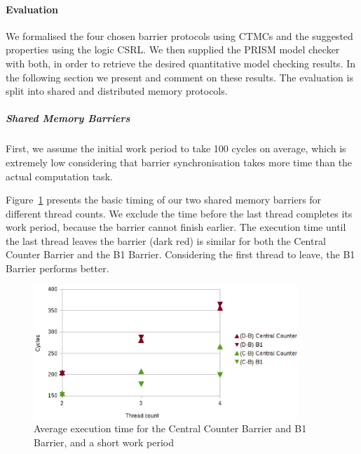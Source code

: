 \documentclass[a4paper, 10pt]{article}
\begin{document}
\paragraph{Evaluation}
\label{ssssec:analysis-modelchecking-quantitative-properties-evaluation}
We formalised the four chosen barrier protocols using CTMCs and the suggested properties using the logic CSRL.
We then supplied the PRISM model checker with both, in order to retrieve the desired quantitative model checking results.
In the following section we present and comment on these results.
The evaluation is split into shared and distributed memory protocols.

\subparagraph{Shared Memory Barriers}
\label{sssssec:analysis-modelchecking-quantitative-properties-evaluation-shared}
First, we assume the initial work period to take 100 cycles on average, which is extremely low considering that barrier synchronisation takes more time than the actual computation task.

Figure~\ref{fig:c1-time-work-100-B-C-D} presents the basic timing of our two shared memory barriers for different thread counts. We exclude the time before the last thread completes its work period, because the barrier cannot finish earlier.
The execution time until the last thread leaves the barrier (dark red) is similar for both the Central Counter Barrier and the B1 Barrier.
Considering the first thread to leave, the B1 Barrier performs better.

\begin{figure}[htbp]
	\centering
	\includegraphics[width=10cm]{charts/c1-time-work-100-B-C-D}
	\caption{Average execution time for the Central Counter Barrier and B1 Barrier, and a short work period}
	\label{fig:c1-time-work-100-B-C-D}
\end{figure}
\end{document}
